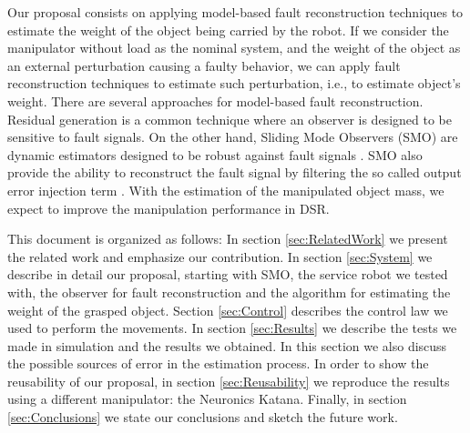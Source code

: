\documentclass[smallextended]{svjour3}       %
\begin{document}
Our proposal consists on applying model-based fault reconstruction techniques \cite{ding2013model} to estimate the weight of the object being carried by the robot. If we consider the manipulator without load  as the nominal system, and the weight of the object as an external perturbation causing a faulty behavior, we can apply fault reconstruction techniques to estimate such perturbation, i.e., to estimate object's weight. There are several approaches for model-based fault reconstruction. Residual generation is a common technique where an observer is designed to be sensitive to fault signals. On the other hand, Sliding Mode Observers (SMO) are dynamic estimators designed to be robust against fault signals \cite{shtessel2014sliding}. SMO also provide the ability to reconstruct the fault signal by filtering the so called output error injection term \cite{alwi2011fault}. With the estimation of the manipulated object mass, we expect to improve the manipulation performance in DSR. 

This document is organized as follows: In section \ref{sec:RelatedWork} we present the related work and emphasize our contribution. In section \ref{sec:System} we describe in detail our proposal, starting with SMO, the service robot we tested with, the observer for fault reconstruction and the algorithm for estimating the weight of the grasped object. Section \ref{sec:Control} describes the control law we used to perform the movements. In section \ref{sec:Results} we describe the tests we made in simulation and the results we obtained. In this section we also discuss the possible sources of error in the estimation process. In order to show the reusability of our proposal, in section \ref{sec:Reusability} we reproduce the results using a different manipulator: the Neuronics Katana. Finally, in section \ref{sec:Conclusions} we state our conclusions and sketch the future work.

\end{document}
